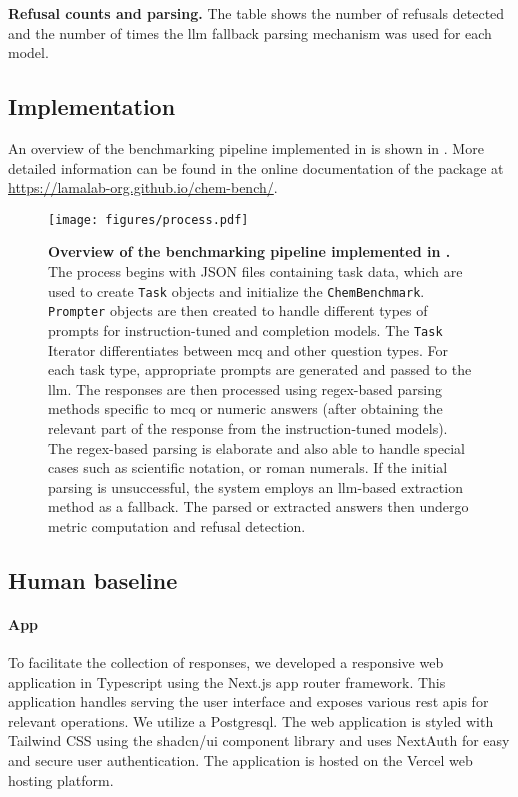 \begin{table}
    \centering
    \caption{\textbf{Refusal counts and parsing.} The table shows the number of refusals detected and the number of times the \gls{llm} fallback parsing mechanism was used for each model.}
    \label{tab:refusal_counts_and_parsing}
\end{table}

\clearpage
\subsection{Implementation}
An overview of the benchmarking pipeline implemented in \chembench is shown in . More detailed information can be found in the online documentation of the \chembench package at \url{https://lamalab-org.github.io/chem-bench/}.
\begin{figure}
    \centering
    \texttt{[image: figures/process.pdf]}
    \caption{\textbf{Overview of the benchmarking pipeline implemented in \chembench.} The process begins with JSON files containing task data, which are used to create \texttt{Task} objects and initialize the \texttt{ChemBenchmark}. \texttt{Prompter} objects are then created to handle different types of prompts for instruction-tuned and completion models.
    The \texttt{Task} Iterator differentiates between \gls{mcq} and other question types. For each task type, appropriate prompts are generated and passed to the \gls{llm}. The responses are then processed using regex-based parsing methods specific to \gls{mcq} or numeric answers (after obtaining the relevant part of the response from the instruction-tuned models).
    The regex-based parsing is elaborate and also able to handle special cases such as scientific notation, or roman numerals.
    If the initial parsing is unsuccessful, the system employs an \gls{llm}-based extraction method as a fallback. The parsed or extracted answers then undergo metric computation and refusal detection.}
    \label{fig:process}
\end{figure}



\clearpage
\subsection{Human baseline} \label{sec:human_baseline}
\paragraph{App} To facilitate the collection of responses, we developed a responsive web application in Typescript using the Next.js\autocite{nextjs} app router framework.
This application handles serving the user interface and exposes various \gls{rest} \glspl{api} for relevant operations.
We utilize a Postgresql.
The web application is styled with Tailwind CSS\autocite{tailwindcss} using the shadcn/ui component library and uses NextAuth\autocite{nextauth} for easy and secure user authentication.
The application is hosted on the Vercel web hosting platform.

